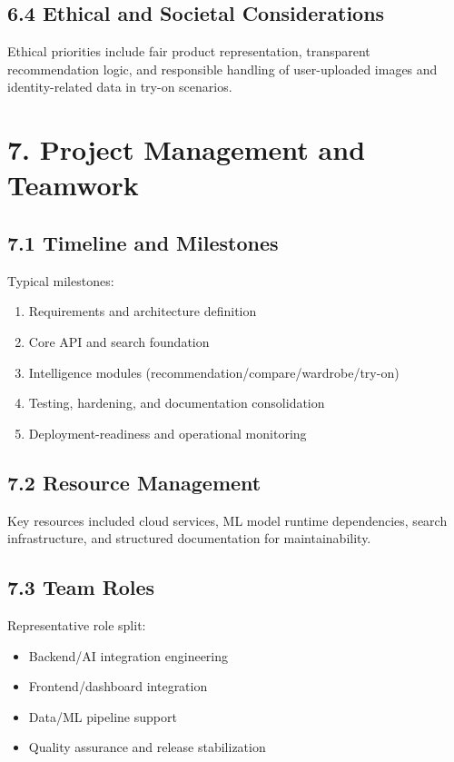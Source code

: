 \documentclass[12pt,a4paper]{report}
\begin{document}
\section{6.4 Ethical and Societal Considerations}
Ethical priorities include fair product representation, transparent recommendation logic, and responsible handling of user-uploaded images and identity-related data in try-on scenarios.


\chapter{7. Project Management and Teamwork}
\section{7.1 Timeline and Milestones}
Typical milestones:

\begin{enumerate}
\item Requirements and architecture definition
\item Core API and search foundation
\item Intelligence modules (recommendation/compare/wardrobe/try-on)
\item Testing, hardening, and documentation consolidation
\item Deployment-readiness and operational monitoring
\end{enumerate}

\section{7.2 Resource Management}
Key resources included cloud services, ML model runtime dependencies, search infrastructure, and structured documentation for maintainability.


\section{7.3 Team Roles}
Representative role split:

\begin{itemize}
\item Backend/AI integration engineering
\item Frontend/dashboard integration
\item Data/ML pipeline support
\item Quality assurance and release stabilization
\end{itemize}
\end{document}
